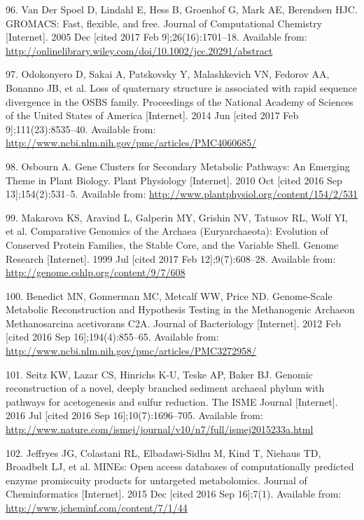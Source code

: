 \documentclass[12pt,twoside]{reedthesis}
\begin{document}
  \hypertarget{ref-van_der_spoel_gromacs_2005}{}
  96. Van Der Spoel D, Lindahl E, Hess B, Groenhof G, Mark AE, Berendsen
  HJC. GROMACS: Fast, flexible, and free. Journal of Computational
  Chemistry {[}Internet{]}. 2005 Dec {[}cited 2017 Feb
  9{]};26(16):1701--18. Available from:
  \url{http://onlinelibrary.wiley.com/doi/10.1002/jcc.20291/abstract}
  
  \hypertarget{ref-odokonyero_loss_2014}{}
  97. Odokonyero D, Sakai A, Patskovsky Y, Malashkevich VN, Fedorov AA,
  Bonanno JB, et al. Loss of quaternary structure is associated with rapid
  sequence divergence in the OSBS family. Proceedings of the National
  Academy of Sciences of the United States of America {[}Internet{]}. 2014
  Jun {[}cited 2017 Feb 9{]};111(23):8535--40. Available from:
  \url{http://www.ncbi.nlm.nih.gov/pmc/articles/PMC4060685/}
  
  \hypertarget{ref-osbourn_gene_2010}{}
  98. Osbourn A. Gene Clusters for Secondary Metabolic Pathways: An
  Emerging Theme in Plant Biology. Plant Physiology {[}Internet{]}. 2010
  Oct {[}cited 2016 Sep 13{]};154(2):531--5. Available from:
  \url{http://www.plantphysiol.org/content/154/2/531}
  
  \hypertarget{ref-makarova_comparative_1999}{}
  99. Makarova KS, Aravind L, Galperin MY, Grishin NV, Tatusov RL, Wolf
  YI, et al. Comparative Genomics of the Archaea (Euryarchaeota):
  Evolution of Conserved Protein Families, the Stable Core, and the
  Variable Shell. Genome Research {[}Internet{]}. 1999 Jul {[}cited 2017
  Feb 12{]};9(7):608--28. Available from:
  \url{http://genome.cshlp.org/content/9/7/608}
  
  \hypertarget{ref-benedict_genome-scale_2012}{}
  100. Benedict MN, Gonnerman MC, Metcalf WW, Price ND. Genome-Scale
  Metabolic Reconstruction and Hypothesis Testing in the Methanogenic
  Archaeon Methanosarcina acetivorans C2A. Journal of Bacteriology
  {[}Internet{]}. 2012 Feb {[}cited 2016 Sep 16{]};194(4):855--65.
  Available from:
  \url{http://www.ncbi.nlm.nih.gov/pmc/articles/PMC3272958/}
  
  \hypertarget{ref-seitz_genomic_2016}{}
  101. Seitz KW, Lazar CS, Hinrichs K-U, Teske AP, Baker BJ. Genomic
  reconstruction of a novel, deeply branched sediment archaeal phylum with
  pathways for acetogenesis and sulfur reduction. The ISME Journal
  {[}Internet{]}. 2016 Jul {[}cited 2016 Sep 16{]};10(7):1696--705.
  Available from:
  \url{http://www.nature.com/ismej/journal/v10/n7/full/ismej2015233a.html}
  
  \hypertarget{ref-jeffryes_mines_2015}{}
  102. Jeffryes JG, Colastani RL, Elbadawi-Sidhu M, Kind T, Niehaus TD,
  Broadbelt LJ, et al. MINEs: Open access databases of computationally
  predicted enzyme promiscuity products for untargeted metabolomics.
  Journal of Cheminformatics {[}Internet{]}. 2015 Dec {[}cited 2016 Sep
  16{]};7(1). Available from: \url{http://www.jcheminf.com/content/7/1/44}
  
\end{document}
